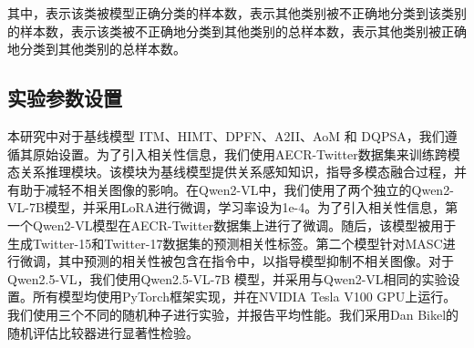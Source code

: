 其中，表示该类被模型正确分类的样本数，表示其他类别被不正确地分类到该类别的样本数，表示该类被不正确地分类到其他类别的总样本数，表示其他类别被正确地分类到其他类别的总样本数。


\subsection{实验参数设置}
% 
本研究中对于基线模型 ITM、HIMT、DPFN、A2II、AoM 和 DQPSA，我们遵循其原始设置。为了引入相关性信息，我们使用AECR-Twitter数据集来训练跨模态关系推理模块。该模块为基线模型提供关系感知知识，指导多模态融合过程，并有助于减轻不相关图像的影响。在Qwen2-VL中，我们使用了两个独立的Qwen2-VL-7B模型，并采用LoRA\cite{hu2022lora}进行微调，学习率设为1e-4。为了引入相关性信息，第一个Qwen2-VL模型在AECR-Twitter数据集上进行了微调。随后，该模型被用于生成Twitter-15和Twitter-17数据集的预测相关性标签。第二个模型针对MASC进行微调，其中预测的相关性被包含在指令中，以指导模型抑制不相关图像。对于Qwen2.5-VL，我们使用Qwen2.5-VL-7B 模型，并采用与Qwen2-VL相同的实验设置。所有模型均使用PyTorch框架实现，并在NVIDIA Tesla V100 GPU上运行。我们使用三个不同的随机种子进行实验，并报告平均性能。我们采用Dan Bikel的随机评估比较器进行显著性检验\cite{lenth1990computer}。

